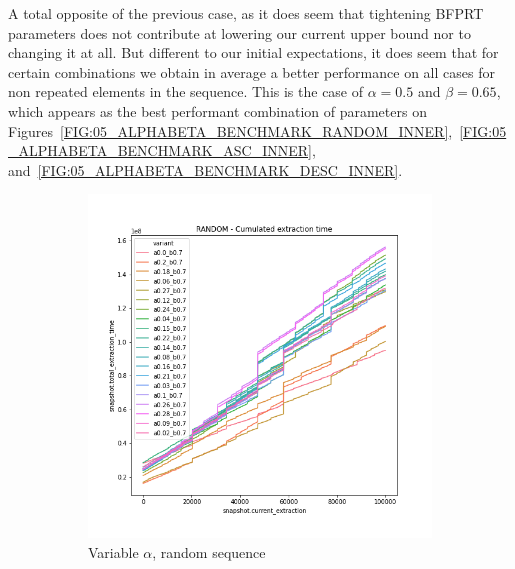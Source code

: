 A total opposite of the previous case, as it does seem that tightening BFPRT parameters does not contribute at lowering our current upper bound nor to changing it at all. But different to our initial expectations, it does seem that for certain combinations we obtain in average a better performance on all cases for non repeated elements in the sequence. This is the case of $\alpha=0.5$ and $\beta=0.65$, which appears as the best performant combination of parameters on Figures~\ref{FIG:05_ALPHABETA_BENCHMARK_RANDOM_INNER},~\ref{FIG:05_ALPHABETA_BENCHMARK_ASC_INNER}, and~\ref{FIG:05_ALPHABETA_BENCHMARK_DESC_INNER}. \\



\begin{figure}
    \centering
    \begin{subfigure}[b]{0.32\textwidth}
        \centering
        \includegraphics[width=\textwidth]{./fragments/04_experimental_execution/images/04_alphabeta_detail_random_left.png.0_0.png}
        \caption{Variable $\alpha$, random sequence}
        \label{FIG:05_ALPHABETA_BENCHMARK_RANDOM_LEFT}
    \end{subfigure}
    \hfill
    \begin{subfigure}[b]{0.32\textwidth}
        \centering

\end{subfigure}
\end{figure}

